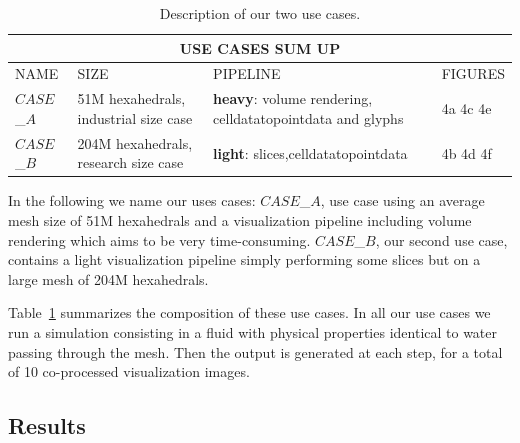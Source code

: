 \begin{table}
\centering
\begin{tabular}{|p{1.5cm}|p{3.0cm}|p{2.70cm}|p{1.50cm}|}
\hline
\multicolumn{4}{|c|}{\textbf{USE CASES SUM UP}}\\
\hline
NAME & SIZE & PIPELINE & FIGURES \\
\hline
$CASE$\_$A$ & 51M hexahedrals, \newline industrial size case & \textbf{heavy}:
\newline volume rendering, \newline celldatatopointdata \newline and glyphs  &
4a 4c 4e\\
\hline
$CASE$\_$B$ & 204M hexahedrals, \newline research size case & \textbf{light}:
\newline 9 slices,\newline celldatatopointdata  & 4b 4d 4f   \\
\hline
\end{tabular}
\caption{Description of our two use cases.}
\label{fig:tab}
\vspace{-0.15in}
\end{table}
In the following we name our uses cases:
$CASE$\_$A$, use case using an average mesh size of 51M hexahedrals and a
visualization pipeline including volume rendering which aims to be very time-consuming.
$CASE$\_$B$, our second use case, contains a light visualization pipeline simply
performing some slices but on a large mesh of 204M hexahedrals.

Table~\ref{fig:tab} summarizes the composition of these use cases. In all our use cases we
run a simulation consisting in a fluid with physical properties identical to
water passing through the mesh. Then the output is generated at each step, for a
total of 10 co-processed visualization images.

\subsection{Results}

